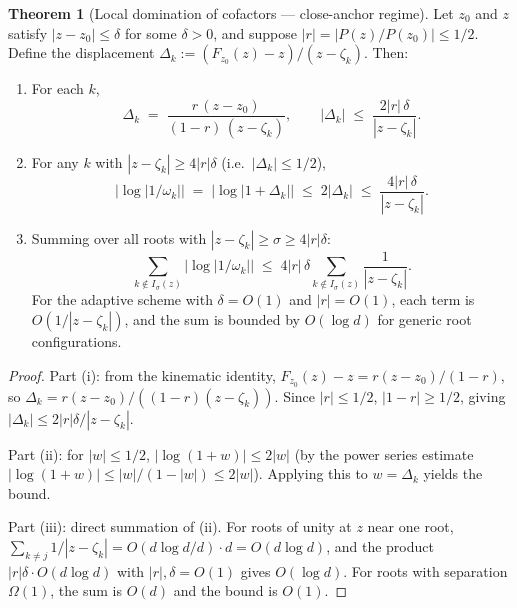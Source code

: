 \documentclass[11pt,a4paper]{article}
\theoremstyle{definition}
\newtheorem{theorem}{Theorem}[section]
\begin{document}
\begin{theorem}[Local domination of cofactors --- close-anchor regime]
\label{lem:cluster_domination}
Let $z_0$ and $z$ satisfy $|z - z_0| \leq \delta$ for some $\delta > 0$, and suppose $|r| = |P(z)/P(z_0)| \leq 1/2$.  Define the displacement $\Delta_k := (F_{z_0}(z) - z)/(z - \zeta_k)$.  Then:
\begin{enumerate}
  \item[\textup{(i)}] For each $k$,
  \begin{equation}
    \label{eq:Delta_k}
    \Delta_k \;=\; \frac{r\,(z-z_0)}{(1-r)\,(z - \zeta_k)},
    \qquad
    |\Delta_k| \;\leq\; \frac{2|r|\,\delta}{|z - \zeta_k|}.
  \end{equation}
  \item[\textup{(ii)}] For any $k$ with $|z - \zeta_k| \geq 4|r|\delta$ (i.e.\ $|\Delta_k| \leq 1/2$),
  \begin{equation}
    \label{eq:far_log_bound}
    \bigl|\log|1/\omega_k|\bigr| \;=\; \bigl|\log|1 + \Delta_k|\bigr|
    \;\leq\; 2|\Delta_k|
    \;\leq\; \frac{4|r|\,\delta}{|z - \zeta_k|}.
  \end{equation}
  \item[\textup{(iii)}] Summing over all roots with $|z - \zeta_k| \geq \sigma \geq 4|r|\delta$:
  \begin{equation}
    \label{eq:far_contribution}
    \sum_{k \notin I_\sigma(z)} \bigl|\log|1/\omega_k|\bigr|
    \;\leq\;
    4|r|\,\delta \sum_{k \notin I_\sigma(z)} \frac{1}{|z-\zeta_k|}.
  \end{equation}
  For the adaptive scheme with $\delta = O(1)$ and $|r| = O(1)$, each term is $O(1/|z-\zeta_k|)$, and the sum is bounded by $O(\log d)$ for generic root configurations.
\end{enumerate}
\end{theorem}

\begin{proof}
Part (i): from the kinematic identity, $F_{z_0}(z) - z = r(z-z_0)/(1-r)$, so $\Delta_k = r(z-z_0)/((1-r)(z-\zeta_k))$.  Since $|r| \leq 1/2$, $|1-r| \geq 1/2$, giving $|\Delta_k| \leq 2|r|\delta/|z-\zeta_k|$.

Part (ii): for $|w| \leq 1/2$, $|\log(1+w)| \leq 2|w|$ (by the power series estimate $|\log(1+w)| \leq |w|/(1-|w|) \leq 2|w|$).  Applying this to $w = \Delta_k$ yields the bound.

Part (iii): direct summation of (ii).  For roots of unity at $z$ near one root, $\sum_{k \neq j} 1/|z-\zeta_k| = O(d\log d/d) \cdot d = O(d\log d)$, and the product $|r|\delta \cdot O(d\log d)$ with $|r|,\delta = O(1)$ gives $O(\log d)$.  For roots with separation $\Omega(1)$, the sum is $O(d)$ and the bound is $O(1)$.
\end{proof}
\end{document}
